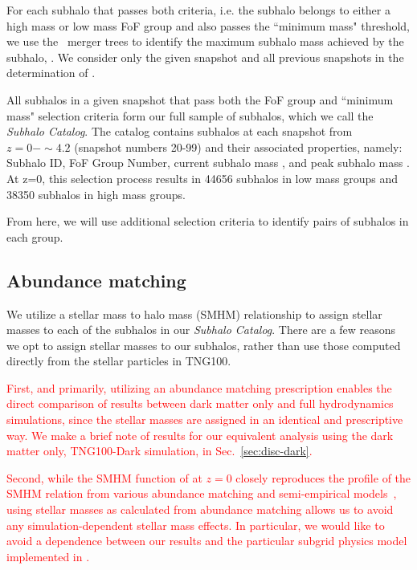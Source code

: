 \documentclass[twocolumn]{aastex631}
\newcommand{\add}[1]{\textcolor{red}{#1}}
\newcommand{\subcat}{\textit{Subhalo Catalog}}
\begin{document}
    For each subhalo that passes both criteria, i.e. the subhalo belongs to either a high mass or low mass FoF group and also passes the ``minimum mass" threshold, we use the \sublink\ merger trees to identify the maximum subhalo mass achieved by the subhalo, \Mpeak. 
    We consider only the given snapshot and all previous snapshots in the determination of \Mpeak.

    All subhalos in a given snapshot that pass both the FoF group and ``minimum mass" selection criteria form our full sample of subhalos, which we call the \subcat. 
    The catalog contains subhalos at each snapshot from $z=0-\sim4.2$ (snapshot numbers 20-99) and their associated properties, namely: Subhalo ID, FoF Group Number, current subhalo mass \Mhalo, and peak subhalo mass \Mpeak. 
    At z=0, this selection process results in 44656 subhalos in low mass groups and 38350 subhalos in high mass groups.   
    
    From here, we will use additional selection criteria to identify pairs of subhalos in each group.

    \subsection{Abundance matching} \label{sec:methods-am}
    We utilize a stellar mass to halo mass (SMHM) relationship to assign stellar masses to each of the subhalos in our \subcat.  
    There are a few reasons we opt to assign stellar masses to our subhalos, rather than use those computed directly from the stellar particles in TNG100.

    
    \add{First, and primarily, utilizing an abundance matching prescription enables the direct comparison of results between dark matter only and full hydrodynamics simulations, since the stellar masses are assigned in an identical and prescriptive way. 
    We make a brief note of results for our equivalent analysis using the dark matter only, TNG100-Dark simulation, in Sec.~\ref{sec:disc-dark}.}
    
    \add{Second, while the SMHM function of \tng{} at $z=0$ closely reproduces the profile of the SMHM relation from various abundance matching and semi-empirical models~\citep{TNG5,Nelson2019}, using stellar masses as calculated from abundance matching allows us to avoid any simulation-dependent stellar mass effects.
    In particular, we would like to avoid a dependence between our results and the particular subgrid physics model implemented in \tng{}.}
    
\end{document}
